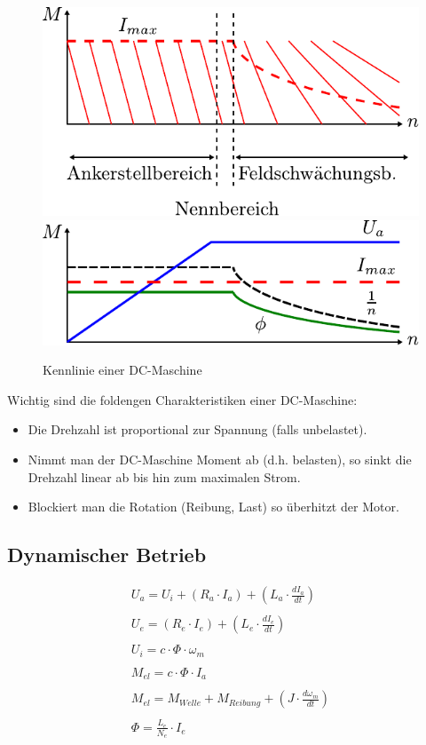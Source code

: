 \begin{figure}[h!]
\centering
\includegraphics[scale=\schscale]{../fig/dc-motor-plot1.pdf}
\includegraphics[scale=\schscale]{../fig/dc-motor-plot2.pdf}
\caption{Kennlinie einer DC-Maschine}
\label{fig:dc-motor-kennlinie}
\end{figure}

\noindent
Wichtig sind die foldengen Charakteristiken einer DC-Maschine:

\begin{itemize}
	\item Die Drehzahl ist proportional zur Spannung (falls unbelastet).
	\item Nimmt man der DC-Maschine Moment ab (d.h. belasten), so sinkt
		die Drehzahl linear ab bis hin zum maximalen Strom.
	\item	Blockiert man die Rotation (Reibung, Last) so überhitzt
		der Motor.
\end{itemize}

\subsection{Dynamischer Betrieb}
\[ \begin{array}{l}
U_a = U_i + (R_a \cdot I_a) + \left(L_a \cdot \frac{d I_a}{d t}\right) \\\\
U_e = (R_e \cdot I_e) + \left(L_e \cdot \frac{d I_e}{d t}\right) \\\\
U_i = c \cdot \Phi \cdot \omega_m \\\\
M_{el} = c \cdot \Phi \cdot I_a \\\\
M_{el} = M_{Welle} + M_{Reibung} + \left( J \cdot \frac{d \omega_m}{d t} \right) \\\\
\Phi = \frac{L_e}{N_e} \cdot I_e
\end{array} \]

